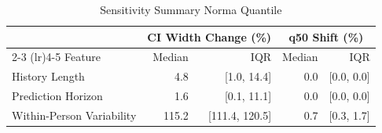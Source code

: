 \begin{table}[ht]
\centering
\footnotesize
\begin{tabular}{lrrrr}
\toprule
 & \multicolumn{2}{c}{CI Width Change (\%)} & \multicolumn{2}{c}{q50 Shift (\%)} \\
\cmidrule(lr){2-3} \cmidrule(lr){4-5}
Feature & Median & IQR & Median & IQR \\
\midrule
History Length & 4.8 & [1.0, 14.4] & 0.0 & [0.0, 0.0] \\
Prediction Horizon & 1.6 & [0.1, 11.1] & 0.0 & [0.0, 0.0] \\
Within-Person Variability & 115.2 & [111.4, 120.5] & 0.7 & [0.3, 1.7] \\
\bottomrule
\end{tabular}
\caption{Sensitivity Summary Norma Quantile}
\label{tab:sensitivity_summary_norma_quantile}
\end{table}
